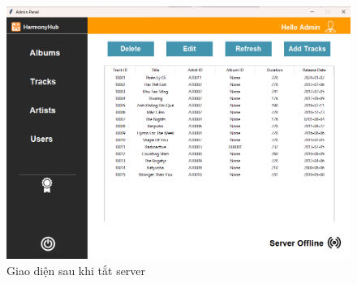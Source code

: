 \documentclass[a4paper]{article}
\begin{document}
\clearpage
\newpage
\begin{flushleft}
	\begin{figure}
		\centering
		\includegraphics[width=\textwidth]{images/serverofflineform.png}
		\caption{Giao diện sau khi tắt server}
	\end{figure}
\end{flushleft}
\clearpage
\newpage
\end{document}
